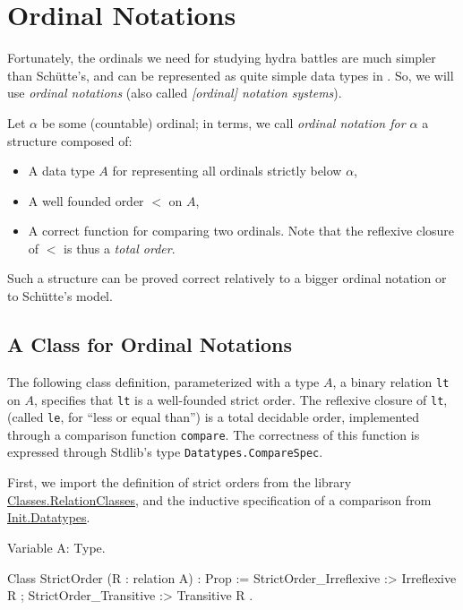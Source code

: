 \section{Ordinal Notations}


Fortunately, the ordinals we need for  studying hydra battles are much simpler than Schütte's, and can be represented as quite simple data types in \gallina. So, we will use \emph{ordinal notations} (also called \emph{[ordinal] notation systems}). 

Let $\alpha$ be some (countable) ordinal; 
in \coq{} terms, we call \emph{ordinal notation for $\alpha$} a structure composed 
of:
\begin{itemize}
\item A data type $A$ for representing all ordinals strictly below $\alpha$,
\item A well founded order $<$ on $A$, 
\item A correct function for comparing two ordinals. Note  that the reflexive closure of $<$ is thus a \emph{total order}.
\end{itemize}


Such a structure can be proved correct relatively to a bigger ordinal notation or
to Schütte's model.





\subsection{A Class for Ordinal Notations}

The following class definition, parameterized with a type $A$, a binary relation \texttt{lt} on $A$, specifies that \texttt{lt} is a well-founded strict order. The reflexive closure of \texttt{lt}, (called \texttt{le}, for ``less  or equal than'') is a total decidable order, implemented through a comparison function \texttt{compare}.  The correctness of this function is expressed through Stdlib's type 
\texttt{Datatypes.CompareSpec}.

First, we import the definition of strict orders from
the library ~\href{https://coq.inria.fr/distrib/current/stdlib/Coq.Classes.RelationClasses.html}{%
Classes.RelationClasses}, 
and the inductive specification of a comparison from
\href{https://coq.inria.fr/distrib/current/stdlib/Coq.Init.Datatypes.html}{%
Init.Datatypes}.

\begin{Coqsrc}
Variable A: Type.

  Class StrictOrder (R : relation A) : Prop := {
    StrictOrder_Irreflexive :> Irreflexive R ;
    StrictOrder_Transitive :> Transitive R }.
\end{Coqsrc}


